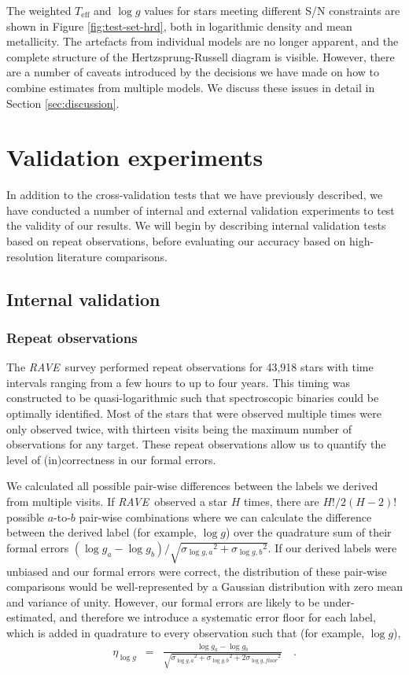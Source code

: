 \documentclass[preprint]{aastex}
\newcommand{\acronym}[1]{{\small{#1}}}
\newcommand{\project}[1]{\textsl{#1}}
\newcommand{\rave}{\project{\acronym{RAVE}}}
\newcommand{\teff}{T_{\mathrm{eff}}}
\newcommand{\logg}{\log g}
\begin{document}
The weighted $\teff$ and $\logg$ values for stars meeting different S/N 
constraints are shown in Figure \ref{fig:test-set-hrd}, both in logarithmic 
density and mean metallicity.  The artefacts from individual models are no 
longer apparent, and the complete structure of the Hertzsprung-Russell diagram
is visible.  However, there are a number of caveats introduced by the decisions
we have made on how to combine estimates from multiple models. We discuss these 
issues in detail in Section \ref{sec:discussion}.


\section{Validation experiments}
\label{sec:validation}


In addition to the cross-validation tests that we have previously described, 
we have conducted a number of internal and external validation experiments to 
test the validity of our results.  We will begin by describing internal validation
tests based on repeat observations, before evaluating our accuracy based on
high-resolution literature comparisons.


\subsection{Internal validation}
\subsubsection{Repeat observations}
\label{sec:repeat-observations}

The \rave\ survey performed repeat observations for 43,918 stars with time 
intervals ranging from a few hours to up to four years.  This timing was 
constructed to be quasi-logarithmic such that spectroscopic binaries could
be optimally identified. Most of the stars that were observed multiple times
were only observed twice, with thirteen visits being the maximum number 
of observations for any target.  These repeat observations allow us to 
quantify the level of (in)correctness in our formal errors.  


We calculated all possible pair-wise differences between the labels we
derived from multiple visits.  If \rave\ observed a star $H$ times, there 
are $H!/2(H-2)!$ possible $a$-to-$b$ pair-wise combinations where we can calculate 
the difference between the derived label (for example, $\logg$) over the
quadrature sum of their formal errors $(\logg_a - \logg_b)/\sqrt{{\sigma_{\logg,a}}^2 + {\sigma_{\logg,b}}^2}$.  If our derived labels were unbiased and our formal
errors were correct, the distribution of these pair-wise comparisons would be
well-represented by a Gaussian distribution with zero mean and variance
of unity.  However, our formal errors are likely to be under-estimated,
and therefore we introduce a systematic error floor for each label, which
is added in quadrature to every observation such that (for example, $\logg$),
\begin{eqnarray}
	\eta_{\logg} & = & \frac{\logg_a - \logg_b}{\sqrt{{\sigma_{\logg,a}}^2 + {\sigma_{\logg,b}}^2 + 2{\sigma_{\logg,floor}}^2}} \quad .
\end{eqnarray}
\end{document}
